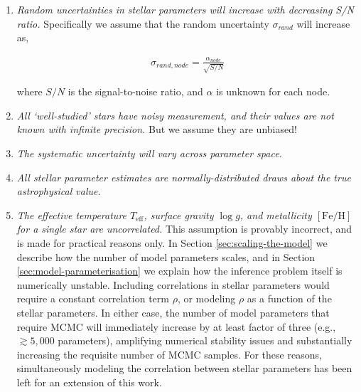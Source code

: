 \documentclass[preprint]{aastex}
\newcommand{\teff}{T_{\mathrm{eff}}}
\newcommand{\logg}{\log g}
\newcommand{\feh}{[\mathrm{Fe/H}]}
\begin{document}
\begin{enumerate}
    \item   \emph{Random uncertainties in stellar parameters will increase with
            decreasing S/N ratio.}
            Specifically we assume that the random uncertainty $\sigma_{rand}$ will
            increase as,

            \begin{eqnarray}
                \sigma_{rand,node} = \frac{\alpha_{node}}{\sqrt{S/N}}
            \end{eqnarray}

            \noindent{}where $S/N$ is the signal-to-noise ratio, and $\alpha$ is
            unknown for each node.

    \item   \emph{All `well-studied' stars have noisy measurement, and their values
            are not known with infinite precision.} But we assume they are unbiased!

    \item   \emph{The systematic uncertainty will vary across parameter space.}

    \item   \emph{All stellar parameter estimates are normally-distributed draws about 
            the true astrophysical value.}

    \item   \emph{The effective temperature $\teff$, surface gravity $\logg$, and
            metallicity $\feh$ for a single star are uncorrelated.}
            This assumption is provably incorrect, and is made for practical reasons
            only. In Section \ref{sec:scaling-the-model} we describe how the number
            of model parameters scales, and in Section \ref{sec:model-parameterisation}
            we explain how the inference problem itself is numerically unstable.
            Including correlations in stellar parameters would require a constant
            correlation term $\rho$, or modeling $\rho$ as a function of the stellar
            parameters. In either case, the number of model parameters that require
            MCMC will immediately increase by at least factor of three (e.g.,
            $\gtrsim5{,}000$ parameters), amplifying numerical stability issues and
            substantially increasing the requisite number of MCMC samples. For these
            reasons, simultaneously modeling the correlation between stellar
            parameters has been left for an extension of this work.
 
\end{enumerate}
\end{document}
